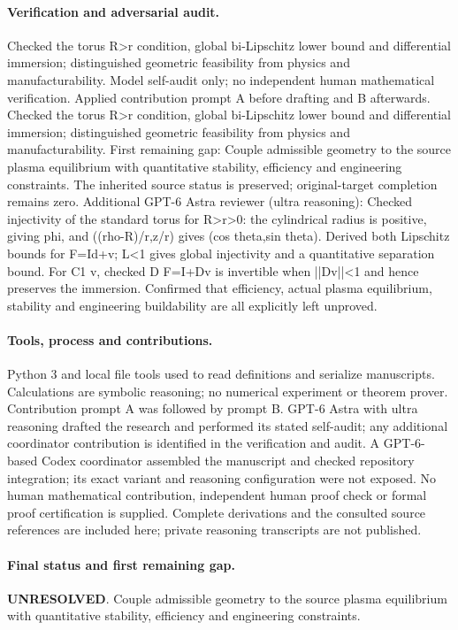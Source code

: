 \documentclass[11pt]{article}
\begin{document}
\paragraph{Verification and adversarial audit.}
Checked the torus R>r condition, global bi-Lipschitz lower bound and differential immersion; distinguished geometric feasibility from physics and manufacturability. Model self-audit only; no independent human mathematical verification. Applied contribution prompt A before drafting and B afterwards. Checked the torus R>r condition, global bi-Lipschitz lower bound and differential immersion; distinguished geometric feasibility from physics and manufacturability. First remaining gap: Couple admissible geometry to the source plasma equilibrium with quantitative stability, efficiency and engineering constraints. The inherited source status is preserved; original-target completion remains zero. Additional GPT-6 Astra reviewer (ultra reasoning): Checked injectivity of the standard torus for R>r>0: the cylindrical radius is positive, giving phi, and ((rho-R)/r,z/r) gives (cos theta,sin theta). Derived both Lipschitz bounds for F=Id+v; L<1 gives global injectivity and a quantitative separation bound. For C1 v, checked D F=I+Dv is invertible when ||Dv||<1 and hence preserves the immersion. Confirmed that efficiency, actual plasma equilibrium, stability and engineering buildability are all explicitly left unproved.

\paragraph{Tools, process and contributions.}
Python 3 and local file tools used to read definitions and serialize manuscripts. Calculations are symbolic reasoning; no numerical experiment or theorem prover. Contribution prompt A was followed by prompt B. GPT-6 Astra with ultra reasoning drafted the research and performed its stated self-audit; any additional coordinator contribution is identified in the verification and audit. A GPT-6-based Codex coordinator assembled the manuscript and checked repository integration; its exact variant and reasoning configuration were not exposed. No human mathematical contribution, independent human proof check or formal proof certification is supplied. Complete derivations and the consulted source references are included here; private reasoning transcripts are not published.

\paragraph{Final status and first remaining gap.}
\textbf{UNRESOLVED}. Couple admissible geometry to the source plasma equilibrium with quantitative stability, efficiency and engineering constraints.
\end{document}
